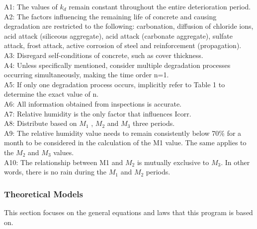 \documentclass[12pt]{article}
\begin{document}
\begin{itemize}

A1: The values of $k_d$ remain constant throughout the entire deterioration period. \\
A2: The factors influencing the remaining life of concrete and causing degradation are restricted to the following: carbonation, diffusion of chloride ions, acid attack (siliceous aggregate), acid attack (carbonate aggregate), sulfate attack, frost attack, active corrosion of steel and reinforcement (propagation). \\
A3: Disregard self-conditions of concrete, such as cover thickness. \\
A4: Unless specifically mentioned, consider multiple degradation processes occurring simultaneously, making the time order n=1. \\
A5: If only one degradation process occurs, implicitly refer to Table 1 to determine the exact value of n.\\
A6: All information obtained from inspections is accurate. \\
A7: Relative humidity is the only factor that influences Icorr. \\
A8: Distribute based on $M_1$ , $M_2$ and $M_3$ three periods. \\
A9: The relative humidity value needs to remain consistently below 70\% for a month to be considered in the calculation of the M1 value. The same applies to the $M_2$ and $M_3$ values. \\
A10: The relationship between M1 and $M_2$ is mutually exclusive to $M_3$. In other words, there is no rain during the $M_1$ and $M_2$ periods.

\end{itemize}

\subsubsection{Theoretical Models}\label{sec_theoretical}

This section focuses on the general equations and laws that this program is based on.
~\newline
\end{document}

